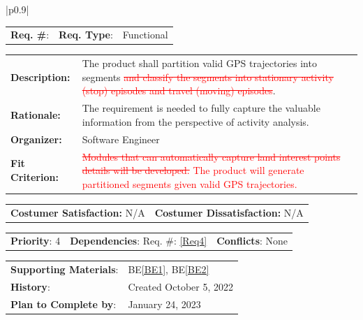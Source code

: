 \documentclass[12pt, titlepage]{article}
\newcommand{\beref}[1]{BE\ref{#1}}
\newcounter{reqnum}
\newcommand{\reqthereqnum}{\textbf{Req. \#}: \thereqnum}
\newcommand{\reqref}[1]{Req. \#: \ref{#1}}
\newenvironment{boxed}
    {\begin{center}
    \begin{tabular}{|p{0.9\textwidth}|}
    \hline\\
    }
    { 
    \\\\\hline
    \end{tabular} 
    \end{center}
    }
\begin{document}
\begin{boxed}
\begin{tabular}{l r r}
{reqnum} \reqthereqnum \label{Req5} & {\bf Req. Type}: &  Functional\\
\end{tabular}
\newline
\begin{tabular}{l p{11.5cm}}
    {\bf Description:} & The product shall partition valid GPS trajectories into segments \textcolor{red}{\sout{and classify the segments into stationary activity (stop) episodes and travel (moving) episodes}}.  \\
    {\bf Rationale:} & The requirement is needed to fully capture the valuable information from the perspective of activity analysis.\\
    {\bf Organizer:} & Software Engineer\\
    {\bf Fit Criterion:} & \textcolor{red}{\sout{Modules that can automatically capture land interest points details will be developed.}
    The product will generate partitioned segments given valid GPS trajectories.}\\
\end{tabular}
\begin{tabular}{l r}
{\bf Costumer Satisfaction:} N/A &  {\bf Costumer Dissatisfaction:}  N/A\\
\end{tabular}
\begin{tabular}{l r r}
    {\bf Priority}: 4 & {\bf Dependencies}: \reqref{Req4} & {\bf Conflicts}: None \\
\end{tabular}
\begin{tabular}{l l}
     {\bf Supporting Materials}:& 
     \beref{BE1}, \beref{BE2} \\ 
     {\bf History}: & Created October 5, 2022\\
     {\bf Plan to Complete by}: & January 24, 2023\\
\end{tabular}
\end{boxed}
\end{document}
